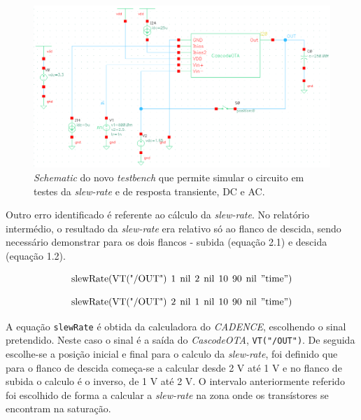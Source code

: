 \documentclass[11pt]{article}
\numberwithin{equation}{section}
\begin{document}
\begin{figure}[H]
	\centering
	\includegraphics[keepaspectratio=true, scale=0.50]{exps/testebenchantigo}
	\vspace{-0.5em}
	\caption{\textit{Schematic} do novo \textit{testbench} que permite simular o circuito em testes da \textit{slew-rate} e de resposta transiente, DC e AC.}
	\vspace{-0.8em}
\end{figure} 

Outro erro identificado é referente ao cálculo da \textit{slew-rate}. No relatório intermédio, o resultado da \textit{slew-rate} era relativo só ao flanco de descida, sendo necessário demonstrar para os dois flancos - subida (equação 2.1) e descida (equação 1.2). 

\vspace{-3mm}
\begin{equation}
	\text{slewRate} (\text{VT("/OUT")} \:\: 1 \:\: \text{nil} \:\: 2 \:\: \text{nil} \:\: 10 \:\: 90 \:\: \text{nil} \:\: "\text{time}")
\end{equation}

\vspace{-3mm}
\begin{equation}
	\text{slewRate} (\text{VT("/OUT")} \:\: 2 \:\: \text{nil} \:\: 1 \:\: \text{nil} \:\: 10 \:\: 90 \:\: \text{nil} \:\: "\text{time}")
\end{equation}

A equação \texttt{slewRate} é obtida da calculadora do \textit{CADENCE}, escolhendo o sinal pretendido. Neste caso o sinal é a saída do \textit{CascodeOTA},	\texttt{VT("/OUT")}. De seguida escolhe-se a posição inicial e final para o calculo da \textit{slew-rate}, foi definido que para o flanco de descida começa-se a calcular desde 2 V até 1 V e no flanco de subida o calculo é o inverso, de 1 V até 2 V. O intervalo anteriormente referido foi escolhido de forma a calcular a \textit{slew-rate} na zona onde os transístores se encontram na saturação.
\end{document}
